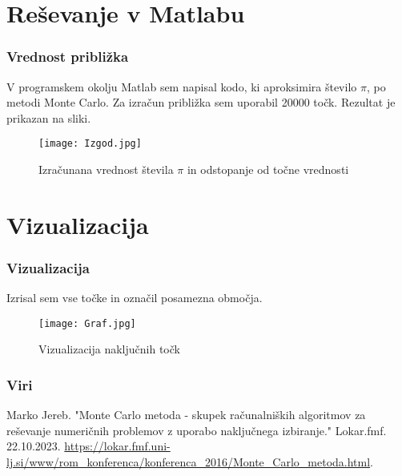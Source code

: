 \documentclass{beamer}
\begin{document}
\section{Reševanje v Matlabu}
\begin{frame}
  \frametitle{Vrednost približka}
  V programskem okolju Matlab sem napisal kodo, ki aproksimira število $\pi$,
  po metodi Monte Carlo. Za izračun približka sem uporabil 20000 točk. Rezultat je prikazan na sliki.
   \begin{figure}
    \centering
    \texttt{[image: Izgod.jpg]}
    \caption{Izračunana vrednost števila $\pi$ in odstopanje od točne vrednosti}
  \end{figure}
\end{frame}
\section{Vizualizacija}
\begin{frame}
  \frametitle{Vizualizacija}
  Izrisal sem vse točke in označil posamezna območja.
  \begin{figure}
    \centering
    \texttt{[image: Graf.jpg]}
    \caption{Vizualizacija naključnih točk}
  \end{figure}
\end{frame}
\begin{frame}
  \frametitle{Viri}
  
  \begin{thebibliography}{1} %
     Marko Jereb. "Monte Carlo metoda - skupek računalniških algoritmov za reševanje numeričnih problemov z uporabo naključnega izbiranje." Lokar.fmf. 22.10.2023. \url{https://lokar.fmf.uni-lj.si/www/rom_konferenca/konferenca_2016/Monte_Carlo_metoda.html}.
  \end{thebibliography}
\end{frame}
\end{document}
